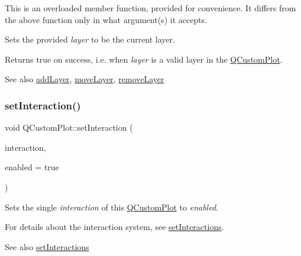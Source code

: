 This is an overloaded member function, provided for convenience. It differs from the above function only in what argument(s) it accepts.

Sets the provided {\itshape layer} to be the current layer.

Returns true on success, i.\+e. when {\itshape layer} is a valid layer in the \hyperlink{class_q_custom_plot}{Q\+Custom\+Plot}.

\begin{DoxySeeAlso}{See also}
\hyperlink{class_q_custom_plot_ad5255393df078448bb6ac83fa5db5f52}{add\+Layer}, \hyperlink{class_q_custom_plot_ae896140beff19424e9e9e02d6e331104}{move\+Layer}, \hyperlink{class_q_custom_plot_a40f75e342c5eaab6a86066a42a0e2a94}{remove\+Layer} 
\end{DoxySeeAlso}
\hypertarget{class_q_custom_plot_a422bf1bc6d56dac75a3d805d9a65902c}{}\label{class_q_custom_plot_a422bf1bc6d56dac75a3d805d9a65902c} 
\subsubsection{\texorpdfstring{set\+Interaction()}{setInteraction()}}
{\footnotesize\ttfamily void Q\+Custom\+Plot\+::set\+Interaction (\begin{DoxyParamCaption}\item[{const \hyperlink{namespace_q_c_p_a2ad6bb6281c7c2d593d4277b44c2b037}{Q\+C\+P\+::\+Interaction} \&}]{interaction,  }\item[{bool}]{enabled = {\ttfamily true} }\end{DoxyParamCaption})}

Sets the single {\itshape interaction} of this \hyperlink{class_q_custom_plot}{Q\+Custom\+Plot} to {\itshape enabled}.

For details about the interaction system, see \hyperlink{class_q_custom_plot_a5ee1e2f6ae27419deca53e75907c27e5}{set\+Interactions}.

\begin{DoxySeeAlso}{See also}
\hyperlink{class_q_custom_plot_a5ee1e2f6ae27419deca53e75907c27e5}{set\+Interactions} 
\end{DoxySeeAlso}
\hypertarget{class_q_custom_plot_a5ee1e2f6ae27419deca53e75907c27e5}{}\label{class_q_custom_plot_a5ee1e2f6ae27419deca53e75907c27e5} 
